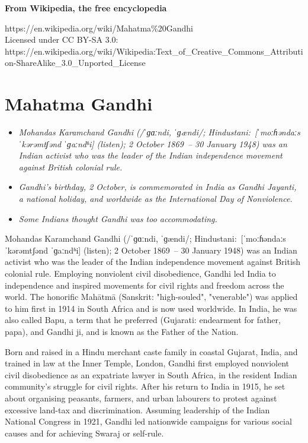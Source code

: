 \textbf{From Wikipedia, the free encyclopedia}

https://en.wikipedia.org/wiki/Mahatma\%20Gandhi\\
Licensed under CC BY-SA 3.0:\\
https://en.wikipedia.org/wiki/Wikipedia:Text\_of\_Creative\_Commons\_Attribution-ShareAlike\_3.0\_Unported\_License

\section{Mahatma Gandhi}\label{mahatma-gandhi}

\begin{itemize}
\item
  \emph{Mohandas Karamchand Gandhi (/ˈɡɑːndi, ˈɡændi/;
  Hindustani:~{[}ˈmoːɦəndaːs ˈkərəmtʃənd ˈɡaːndʱi{]} (listen); 2 October
  1869~-- 30 January 1948) was an Indian activist who was the leader of
  the Indian independence movement against British colonial rule.}
\item
  \emph{Gandhi's birthday, 2 October, is commemorated in India as Gandhi
  Jayanti, a national holiday, and worldwide as the International Day of
  Nonviolence.}
\item
  \emph{Some Indians thought Gandhi was too accommodating.}
\end{itemize}

Mohandas Karamchand Gandhi (/ˈɡɑːndi, ˈɡændi/;
Hindustani:~{[}ˈmoːɦəndaːs ˈkərəmtʃənd ˈɡaːndʱi{]} (listen); 2 October
1869~-- 30 January 1948) was an Indian activist who was the leader of
the Indian independence movement against British colonial rule.
Employing nonviolent civil disobedience, Gandhi led India to
independence and inspired movements for civil rights and freedom across
the world. The honorific Mahātmā (Sanskrit: "high-souled", "venerable")
was applied to him first in 1914 in South Africa and is now used
worldwide. In India, he was also called Bapu, a term that he preferred
(Gujarati: endearment for father, papa), and Gandhi ji, and is known as
the Father of the Nation.

Born and raised in a Hindu merchant caste family in coastal Gujarat,
India, and trained in law at the Inner Temple, London, Gandhi first
employed nonviolent civil disobedience as an expatriate lawyer in South
Africa, in the resident Indian community's struggle for civil rights.
After his return to India in 1915, he set about organising peasants,
farmers, and urban labourers to protest against excessive land-tax and
discrimination. Assuming leadership of the Indian National Congress in
1921, Gandhi led nationwide campaigns for various social causes and for
achieving Swaraj or self-rule.

